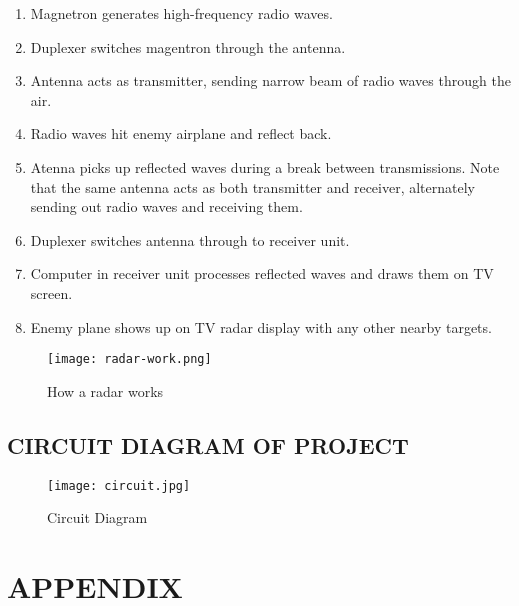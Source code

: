 \documentclass[13pt,a4paper]{report}
\begin{document}
                        \begin{enumerate}
                            \item Magnetron generates high-frequency radio waves.
                            \item Duplexer switches magentron through the antenna.
                            \item Antenna acts as transmitter, sending narrow beam of radio waves through the air.
                            \item Radio waves hit enemy airplane and reflect back.
                            \item Atenna picks up reflected waves during a break between transmissions. Note that the same antenna 
                            acts as both transmitter and receiver, alternately sending out radio waves and receiving them.
                            \item Duplexer switches antenna through to receiver unit.
                            \item Computer in receiver unit processes reflected waves and draws them on TV screen.
                            \item Enemy plane shows up on TV radar display with any other nearby targets. 
                        \end{enumerate}
                        \begin{figure}[H]
                            \centering
                            \texttt{[image: radar-work.png]}
                            \caption{\label{fig:pic}How a radar works}
                        \end{figure}
        \section{CIRCUIT DIAGRAM OF PROJECT}
            \begin{figure}[H]
                \centering
                \texttt{[image: circuit.jpg]}
                \caption{\label{fig:pic}Circuit Diagram}
            \end{figure}

    \chapter{APPENDIX}
    \renewcommand{\headrulewidth}{0.5pt}
    \renewcommand{\footrulewidth}{0.5pt}
    \thispagestyle{fancy}
    \fancyhf{}
    \raggedright
        
\end{document}
